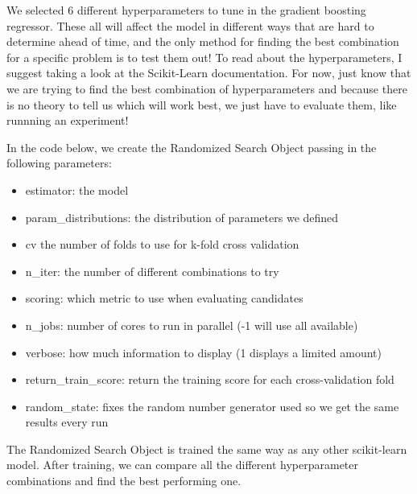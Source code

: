 \documentclass[11pt]{article}
\providecommand{\tightlist}{%
      \setlength{\itemsep}{0pt}\setlength{\parskip}{0pt}}
\begin{document}
    We selected 6 different hyperparameters to tune in the gradient boosting
regressor. These all will affect the model in different ways that are
hard to determine ahead of time, and the only method for finding the
best combination for a specific problem is to test them out! To read
about the hyperparameters, I suggest taking a look at the Scikit-Learn
documentation. For now, just know that we are trying to find the best
combination of hyperparameters and because there is no theory to tell us
which will work best, we just have to evaluate them, like runnning an
experiment!

In the code below, we create the Randomized Search Object passing in the
following parameters:

\begin{itemize}
\tightlist
\item
  estimator: the model
\item
  param\_distributions: the distribution of parameters we defined
\item
  cv the number of folds to use for k-fold cross validation
\item
  n\_iter: the number of different combinations to try
\item
  scoring: which metric to use when evaluating candidates
\item
  n\_jobs: number of cores to run in parallel (-1 will use all
  available)
\item
  verbose: how much information to display (1 displays a limited amount)
\item
  return\_train\_score: return the training score for each
  cross-validation fold
\item
  random\_state: fixes the random number generator used so we get the
  same results every run
\end{itemize}

The Randomized Search Object is trained the same way as any other
scikit-learn model. After training, we can compare all the different
hyperparameter combinations and find the best performing one.
\end{document}
